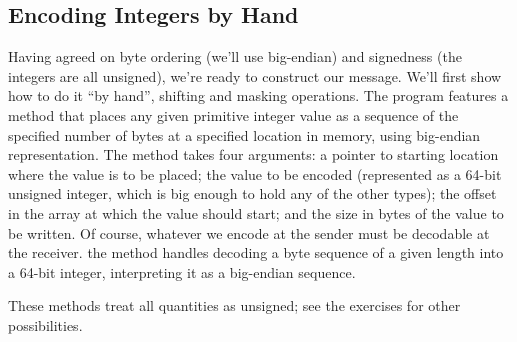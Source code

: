 \subsection{Encoding Integers by Hand}

Having agreed on byte ordering (we'll use big-endian) and signedness
(the integers are all unsigned), we're ready to construct our message.
We'll first show how to do it ``by hand'', shifting and masking
operations.  The program  features a method
 that places any given primitive integer
value as a sequence of the specified number of bytes at a specified
location in memory, using big-endian representation.
%
The method takes four arguments:
a pointer to starting location where the
value is to be placed; the value to be encoded (represented as a
64-bit unsigned integer, which is big enough to hold any of the other types);
the offset in the array at which the value should start; and
the size in bytes of the value to be written.
Of course, whatever we encode at the sender must be decodable at
the receiver. 
the 
method handles decoding a byte sequence of a given length
into a 64-bit integer, interpreting it as a big-endian sequence.

These methods treat all quantities as unsigned; see the exercises for
other possibilities.


